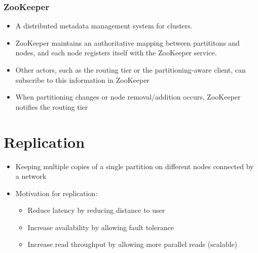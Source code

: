 \documentclass{article}
\begin{document}
\subsubsection{ZooKeeper}
\begin{itemize}
    \item A distributed metadata management system for clusters. 
    
    \item ZooKeeper maintains an authoritative mapping between partititons and nodes, and each node registers itself with the ZooKeeper service. 
    
    \item Other actors, such as the routing tier or the partitioning-aware client, can subscribe to this information in ZooKeeper
    
    \item When partitioning changes or node removal/addition occurs, ZooKeeper notifies the routing tier 
\end{itemize}

\section{Replication}
\begin{itemize}
    \item Keeping multiple copies of a single partition on different nodes connected by a network
    
    \item Motivation for replication:
    \begin{itemize}
        \item Reduce latency by reducing distance to user
        
        \item Increase availability by allowing fault tolerance
        
        \item Increase read throughput by allowing more parallel reads (scalable)
    \end{itemize}
\end{itemize}
\end{document}
